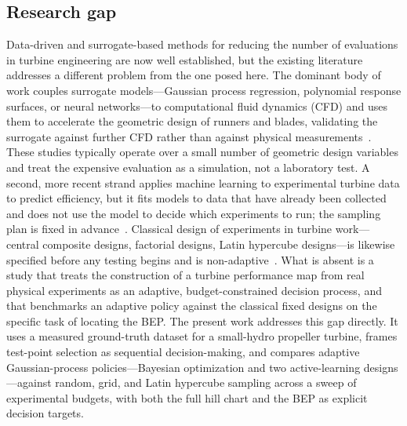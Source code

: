 \documentclass[preprint,12pt]{elsarticle}
\begin{document}
\subsection{Research gap}
Data-driven and surrogate-based methods for reducing the number of evaluations in
turbine engineering are now well established, but the existing literature addresses a
different problem from the one posed here. The dominant body of work couples
surrogate models---Gaussian process regression, polynomial response surfaces, or
neural networks---to computational fluid dynamics (CFD) and uses them to accelerate
the geometric design of runners and blades, validating the surrogate against further
CFD rather than against physical measurements~\cite{masood2021ml}. These studies
typically operate over a small number of geometric design variables and treat the
expensive evaluation as a simulation, not a laboratory test. A second, more recent
strand applies machine learning to experimental turbine data to predict efficiency,
but it fits models to data that have already been collected and does not use the
model to decide which experiments to run; the sampling plan is fixed in
advance~\cite{besni2025ml}. Classical design of experiments in turbine work---central
composite designs, factorial designs, Latin hypercube designs---is likewise
specified before any testing begins and is non-adaptive~\cite{betancour2023vortex}.
What is absent is a study that treats the construction of a turbine performance map
from real physical experiments as an adaptive, budget-constrained decision process,
and that benchmarks an adaptive policy against the classical fixed designs on the
specific task of locating the BEP. The present work addresses this gap directly. It
uses a measured ground-truth dataset for a small-hydro propeller turbine, frames
test-point selection as sequential decision-making, and compares adaptive
Gaussian-process policies---Bayesian optimization and two active-learning
designs---against random, grid, and Latin hypercube sampling across a sweep of
experimental budgets, with both the full hill chart and the BEP as explicit decision
targets.
\end{document}
